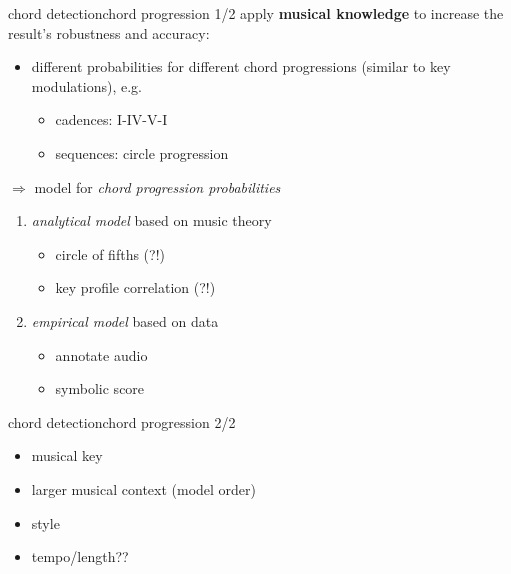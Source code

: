         \begin{frame}{chord detection}{chord progression 1/2}
            apply \textbf{musical knowledge} to increase the result's robustness and accuracy:
            
            \begin{itemize}
                \item	different probabilities for different chord progressions (similar to key modulations), e.g.
                \begin{itemize}
                    \item	cadences: I-IV-V-I
                    \item	sequences: circle progression
                    
                \end{itemize}
            \end{itemize}

            $\Rightarrow$ model for \textit{chord progression probabilities}
            \begin{enumerate}
                \item<2->	\textit{analytical model} based on music theory
                    \begin{itemize}
                        \item	circle of fifths (?!)
                        \item	key profile correlation (?!)
                    \end{itemize}
                \item<3->	\textit{empirical model} based on data
                    \begin{itemize}	
                        \item	annotate audio
                        \item	symbolic score
                    \end{itemize}
            \end{enumerate}
        \end{frame}
        \begin{frame}{chord detection}{chord progression 2/2}

            \begin{itemize}
                \item 	musical key
                \item	larger musical context (model order)
                \item	style
                \item   tempo/length??
            \end{itemize}
        \end{frame}
